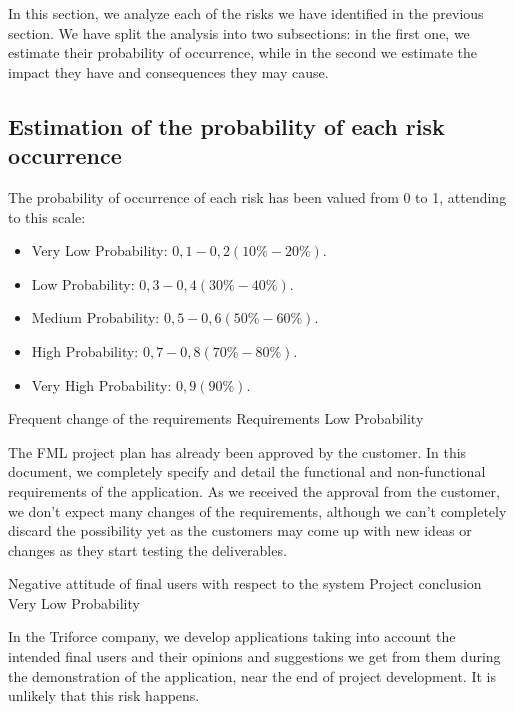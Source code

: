 
In this section, we analyze each of the risks we have identified in the previous section. We have split the analysis into two subsections: in the first one, we estimate their probability of occurrence, while in the second we estimate the impact they have and consequences they may cause.

\subsection{Estimation of the probability of each risk occurrence}
The probability of occurrence of each risk has been valued from 0 to 1, attending to this scale:
\begin{itemize}
\item Very Low Probability: $0,1-0,2 (10\%-20\%)$.
\item Low Probability: $0,3-0,4 (30\%-40\%)$.
\item Medium Probability: $0,5-0,6 (50\%-60\%)$.
\item High Probability: $0,7-0,8 (70\%-80\%)$.
\item Very High Probability: $0,9 (90\%)$.
\end{itemize}


\begin{risk}[riskReqChange]{Frequent change of the requirements}
\riskcat Requirements
 Low Probability

The FML project plan has already been approved by the customer. In this document, we completely specify and detail the functional and non-functional requirements of the application. As we received the approval from the customer, we don't expect many changes of the requirements, although we can't completely discard the possibility yet as the customers may come up with new ideas or changes as they start testing the deliverables.
\end{risk}

\begin{risk}[riskAttitude]{Negative attitude of final users with respect to the system}
\riskcat Project conclusion
 Very Low Probability

In the Triforce company, we develop applications taking into account the intended final users and their opinions and suggestions we get from them during the demonstration of the application, near the end of project development. It is unlikely that this risk happens.
\end{risk}


